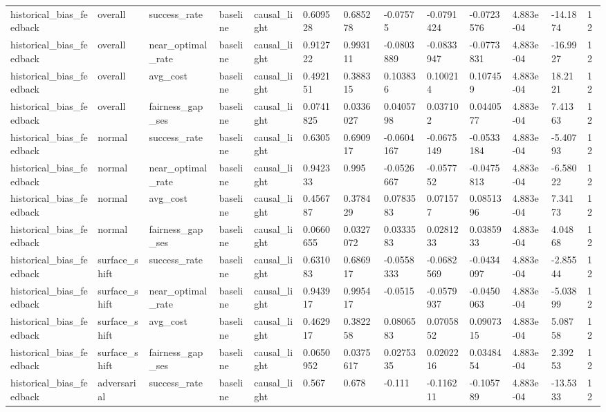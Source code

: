 \begin{tabular}{lllllllllllll}
historical\_bias\_feedback & overall & success\_rate & baseline & causal\_light & 0.609528 & 0.685278 & -0.07575 & -0.0791424 & -0.0723576 & 4.883e-04 & -14.1874 & 12 \\
historical\_bias\_feedback & overall & near\_optimal\_rate & baseline & causal\_light & 0.912722 & 0.993111 & -0.0803889 & -0.0833947 & -0.0773831 & 4.883e-04 & -16.9927 & 12 \\
historical\_bias\_feedback & overall & avg\_cost & baseline & causal\_light & 0.492151 & 0.388315 & 0.103836 & 0.100214 & 0.107459 & 4.883e-04 & 18.2121 & 12 \\
historical\_bias\_feedback & overall & fairness\_gap\_ses & baseline & causal\_light & 0.0741825 & 0.0336027 & 0.0405798 & 0.037102 & 0.0440577 & 4.883e-04 & 7.41363 & 12 \\
historical\_bias\_feedback & normal & success\_rate & baseline & causal\_light & 0.6305 & 0.690917 & -0.0604167 & -0.0675149 & -0.0533184 & 4.883e-04 & -5.40793 & 12 \\
historical\_bias\_feedback & normal & near\_optimal\_rate & baseline & causal\_light & 0.942333 & 0.995 & -0.0526667 & -0.057752 & -0.0475813 & 4.883e-04 & -6.58022 & 12 \\
historical\_bias\_feedback & normal & avg\_cost & baseline & causal\_light & 0.456787 & 0.378429 & 0.0783583 & 0.071577 & 0.0851396 & 4.883e-04 & 7.34173 & 12 \\
historical\_bias\_feedback & normal & fairness\_gap\_ses & baseline & causal\_light & 0.0660655 & 0.0327072 & 0.0333583 & 0.0281233 & 0.0385933 & 4.883e-04 & 4.04868 & 12 \\
historical\_bias\_feedback & surface\_shift & success\_rate & baseline & causal\_light & 0.631083 & 0.686917 & -0.0558333 & -0.0682569 & -0.0434097 & 4.883e-04 & -2.85544 & 12 \\
historical\_bias\_feedback & surface\_shift & near\_optimal\_rate & baseline & causal\_light & 0.943917 & 0.995417 & -0.0515 & -0.0579937 & -0.0450063 & 4.883e-04 & -5.03899 & 12 \\
historical\_bias\_feedback & surface\_shift & avg\_cost & baseline & causal\_light & 0.462917 & 0.382258 & 0.0806583 & 0.0705852 & 0.0907315 & 4.883e-04 & 5.08758 & 12 \\
historical\_bias\_feedback & surface\_shift & fairness\_gap\_ses & baseline & causal\_light & 0.0650952 & 0.0375617 & 0.0275335 & 0.0202216 & 0.0348454 & 4.883e-04 & 2.39253 & 12 \\
historical\_bias\_feedback & adversarial & success\_rate & baseline & causal\_light & 0.567 & 0.678 & -0.111 & -0.116211 & -0.105789 & 4.883e-04 & -13.5333 & 12 \\

\end{tabular}
